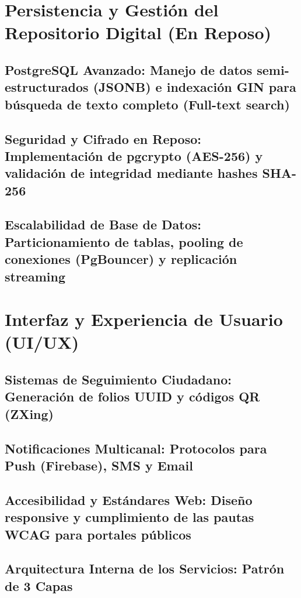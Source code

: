 \section{Persistencia y Gestión del Repositorio Digital (En Reposo)}
\subsection{PostgreSQL Avanzado: Manejo de datos semi-estructurados (JSONB) e indexación GIN para búsqueda de texto completo (Full-text search)}
\subsection{Seguridad y Cifrado en Reposo: Implementación de pgcrypto (AES-256) y validación de integridad mediante hashes SHA-256}
\subsection{Escalabilidad de Base de Datos: Particionamiento de tablas, pooling de conexiones (PgBouncer) y replicación streaming}

\section{Interfaz y Experiencia de Usuario (UI/UX)}
\subsection{Sistemas de Seguimiento Ciudadano: Generación de folios UUID y códigos QR (ZXing)}
\subsection{Notificaciones Multicanal: Protocolos para Push (Firebase), SMS y Email}
\subsection{Accesibilidad y Estándares Web: Diseño responsive y cumplimiento de las pautas WCAG para portales públicos}


\subsection{Arquitectura Interna de los Servicios: Patrón de 3 Capas}

